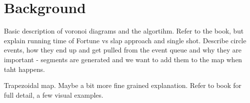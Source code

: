 \section{Background}

Basic description of voronoi diagrams and the algortihm. Refer to the book, but explain running time of Fortune vs slap approach and single shot. Describe circle events, how they end up and get pulled from the event queue and why they are important - segments are generated and we want to add them to the map when taht happens.

Trapezoidal map. Maybe a bit more fine grained explanation. Refer to book for full detail, a few visual examples.

